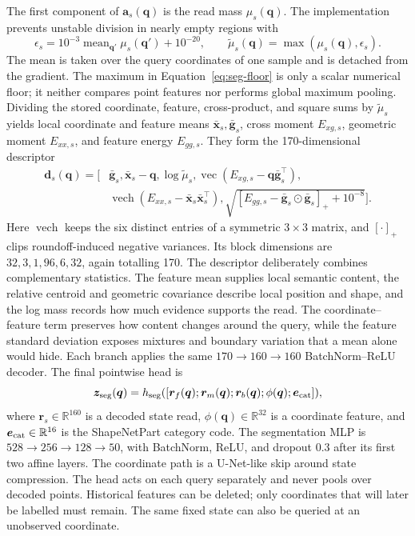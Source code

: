 \documentclass[11pt,a4paper]{article}
\newcommand{\R}{\mathbb{R}}
\newcommand{\vect}{\operatorname{vec}}
\begin{document}
The first component of $\bm a_s(\bm q)$ is the read mass $\mu_s(\bm q)$. The implementation prevents unstable division in nearly empty regions with
\begin{equation}
\epsilon_s=10^{-3}\operatorname{mean}_{\bm q'}\mu_s(\bm q')+10^{-20},
\qquad
\widetilde\mu_s(\bm q)=\max(\mu_s(\bm q),\epsilon_s).
\label{eq:seg-floor}
\end{equation}
The mean is taken over the query coordinates of one sample and is detached from the gradient. The maximum in Equation~\eqref{eq:seg-floor} is only a scalar numerical floor; it neither compares point features nor performs global maximum pooling. Dividing the stored coordinate, feature, cross-product, and square sums by $\widetilde\mu_s$ yields local coordinate and feature means $\bar{\bm x}_s,\bar{\bm g}_s$, cross moment $E_{xg,s}$, geometric moment $E_{xx,s}$, and feature energy $E_{gg,s}$. They form the 170-dimensional descriptor
\begin{equation}
\begin{aligned}
\bm d_s(\bm q)=[&\bar{\bm g}_s,\bar{\bm x}_s-\bm q,\log\widetilde\mu_s,
\vect(E_{xg,s}-\bm q\bar{\bm g}_s^\top),\\
&\operatorname{vech}(E_{xx,s}-\bar{\bm x}_s\bar{\bm x}_s^\top),
\sqrt{[E_{gg,s}-\bar{\bm g}_s\odot\bar{\bm g}_s]_++10^{-8}}].
\end{aligned}
\label{eq:query-descriptor-main}
\end{equation}
Here $\operatorname{vech}$ keeps the six distinct entries of a symmetric $3\times3$ matrix, and $[\cdot]_+$ clips roundoff-induced negative variances. Its block dimensions are $32,3,1,96,6,32$, again totalling 170. The descriptor deliberately combines complementary statistics. The feature mean supplies local semantic content, the relative centroid and geometric covariance describe local position and shape, and the log mass records how much evidence supports the read. The coordinate--feature term preserves how content changes around the query, while the feature standard deviation exposes mixtures and boundary variation that a mean alone would hide. Each branch applies the same $170\rightarrow160\rightarrow160$ BatchNorm--ReLU decoder. The final pointwise head is
\begin{equation}
\bm z_{\rm seg}(\bm q)=h_{\rm seg}([\bm r_f(\bm q);\bm r_m(\bm q);
\bm r_b(\bm q);\phi(\bm q);\bm e_{\rm cat}]),
\label{eq:seg-main}
\end{equation}
where $\bm r_s\in\R^{160}$ is a decoded state read, $\phi(\bm q)\in\R^{32}$ is a coordinate feature, and $\bm e_{\rm cat}\in\R^{16}$ is the ShapeNetPart category code. The segmentation MLP is $528\rightarrow256\rightarrow128\rightarrow50$, with BatchNorm, ReLU, and dropout $0.3$ after its first two affine layers. The coordinate path is a U-Net-like skip around state compression. The head acts on each query separately and never pools over decoded points. Historical features can be deleted; only coordinates that will later be labelled must remain. The same fixed state can also be queried at an unobserved coordinate.
\end{document}
